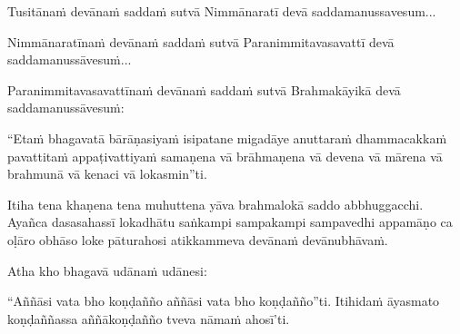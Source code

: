 \begin{pali-hang}
Tusitānaṁ devānaṁ saddaṁ sutvā Nimmānaratī devā saddamanussavesum...
\end{pali-hang}

\begin{pali-hang}
Nimmānaratīnaṁ devānaṁ saddaṁ sutvā Paranimmitavasavattī devā saddamanussāvesuṁ...
\end{pali-hang}

\begin{pali-hang}
Paranimmitavasavattīnaṁ devānaṁ saddaṁ sutvā Brahmakāyikā devā saddamanussāvesuṁ:
\end{pali-hang}

\begin{pali-hang}
``Etaṁ bhagavatā bārāṇasiyaṁ isipatane migadāye anuttaraṁ dhammacakkaṁ pavattitaṁ appaṭivattiyaṁ samaṇena vā brāhmaṇena vā devena vā mārena vā brahmunā vā kenaci vā lokasmin''ti.
\end{pali-hang}

\begin{pali-hang}
Itiha tena khaṇena tena muhuttena yāva brahmalokā saddo abbhuggacchi. Ayañca dasasahassī lokadhātu saṅkampi sampakampi sampavedhi appamāṇo ca oḷāro obhāso loke pāturahosi atikkammeva devānaṁ devānubhāvaṁ.
\end{pali-hang}

Atha kho bhagavā udānaṁ udānesi:

\begin{pali-hang}
``Aññāsi vata bho koṇḍañño aññāsi vata bho koṇḍañño''ti. Itihidaṁ āyasmato koṇḍaññassa aññākoṇḍañño tveva nāmaṁ ahosī'ti.
\end{pali-hang}

\suttaRef{[SN 56.11]}
